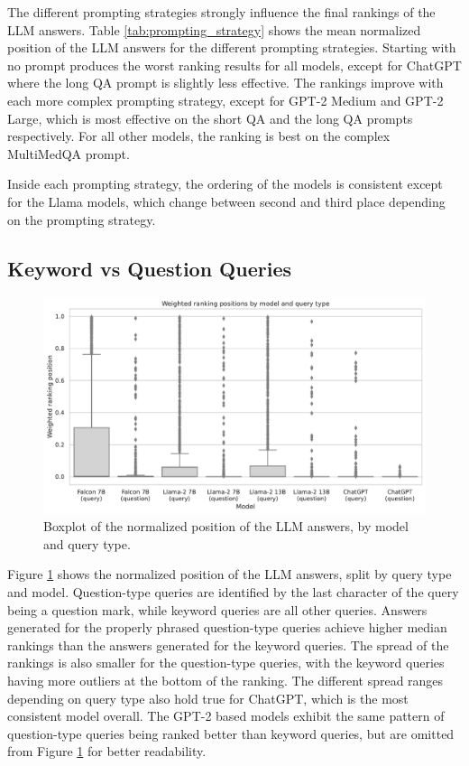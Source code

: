 The different prompting strategies strongly influence the final rankings of the LLM answers.
Table \ref{tab:prompting_strategy} shows the mean normalized position of the LLM answers for the different prompting strategies.
Starting with no prompt produces the worst ranking results for all models, except for ChatGPT where the long QA prompt is slightly less effective.
The rankings improve with each more complex prompting strategy, except for GPT-2 Medium and GPT-2 Large, which is most effective on the short QA and the long QA prompts respectively.
For all other models, the ranking is best on the complex MultiMedQA prompt.

Inside each prompting strategy, the ordering of the models is consistent except for the Llama models, which change between second and third place depending on the prompting strategy.

\subsection{Keyword vs Question Queries}
\begin{figure}
    \centering
    \includegraphics[width=\textwidth]{images/weighted_position_boxplot_by_model_and_question.pdf}
    \caption{Boxplot of the normalized position of the LLM answers, by model and query type.}
    \label{fig:weighted_position_boxplot_by_model_and_question}
\end{figure}
Figure \ref{fig:weighted_position_boxplot_by_model_and_question} shows the normalized position of the LLM answers, split by query type and model.
Question-type queries are identified by the last character of the query being a question mark, while keyword queries are all other queries.
Answers generated for the properly phrased question-type queries achieve higher median rankings than the answers generated for the keyword queries.
The spread of the rankings is also smaller for the question-type queries, with the keyword queries having more outliers at the bottom of the ranking.
The different spread ranges depending on query type also hold true for ChatGPT, which is the most consistent model overall.
The GPT-2 based models exhibit the same pattern of question-type queries being ranked better than keyword queries, but are omitted from Figure \ref{fig:weighted_position_boxplot_by_model_and_question} for better readability.

